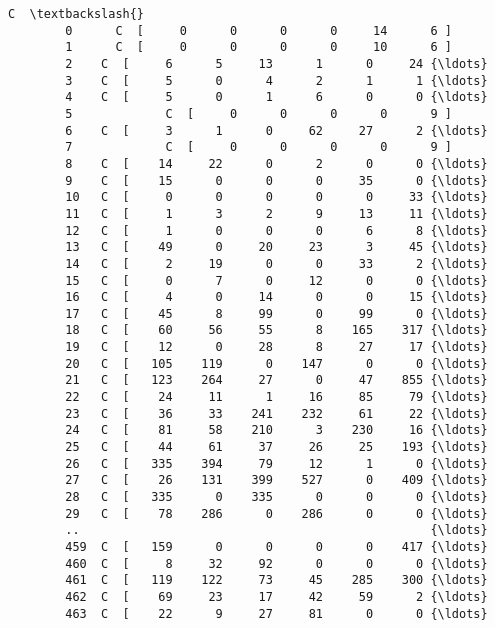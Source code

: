 \documentclass[11pt]{article}
\begin{document}
\begin{Verbatim}[commandchars=\\\{\}]
                                                             C  \textbackslash{}
        0      C  [     0      0      0      0     14      6 ]   
        1      C  [     0      0      0      0     10      6 ]   
        2    C  [     6      5     13      1      0     24 {\ldots}   
        3    C  [     5      0      4      2      1      1 {\ldots}   
        4    C  [     5      0      1      6      0      0 {\ldots}   
        5             C  [     0      0      0      0      9 ]   
        6    C  [     3      1      0     62     27      2 {\ldots}   
        7             C  [     0      0      0      0      9 ]   
        8    C  [    14     22      0      2      0      0 {\ldots}   
        9    C  [    15      0      0      0     35      0 {\ldots}   
        10   C  [     0      0      0      0      0     33 {\ldots}   
        11   C  [     1      3      2      9     13     11 {\ldots}   
        12   C  [     1      0      0      0      6      8 {\ldots}   
        13   C  [    49      0     20     23      3     45 {\ldots}   
        14   C  [     2     19      0      0     33      2 {\ldots}   
        15   C  [     0      7      0     12      0      0 {\ldots}   
        16   C  [     4      0     14      0      0     15 {\ldots}   
        17   C  [    45      8     99      0     99      0 {\ldots}   
        18   C  [    60     56     55      8    165    317 {\ldots}   
        19   C  [    12      0     28      8     27     17 {\ldots}   
        20   C  [   105    119      0    147      0      0 {\ldots}   
        21   C  [   123    264     27      0     47    855 {\ldots}   
        22   C  [    24     11      1     16     85     79 {\ldots}   
        23   C  [    36     33    241    232     61     22 {\ldots}   
        24   C  [    81     58    210      3    230     16 {\ldots}   
        25   C  [    44     61     37     26     25    193 {\ldots}   
        26   C  [   335    394     79     12      1      0 {\ldots}   
        27   C  [    26    131    399    527      0    409 {\ldots}   
        28   C  [   335      0    335      0      0      0 {\ldots}   
        29   C  [    78    286      0    286      0      0 {\ldots}   
        ..                                                 {\ldots}   
        459  C  [   159      0      0      0      0    417 {\ldots}   
        460  C  [     8     32     92      0      0      0 {\ldots}   
        461  C  [   119    122     73     45    285    300 {\ldots}   
        462  C  [    69     23     17     42     59      2 {\ldots}   
        463  C  [    22      9     27     81      0      0 {\ldots}   

\end{Verbatim}
\end{document}
